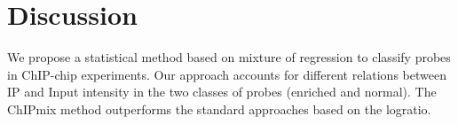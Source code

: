 \documentclass{llncs}
\begin{document}

\section{Discussion}\label{discu}
We propose a statistical method based on mixture of regression to
classify probes in ChIP-chip experiments. Our approach accounts for
different relations between IP and Input intensity in the two
classes of probes (enriched and normal). The ChIPmix method
outperforms the standard approaches based on the logratio.
\end{document}
